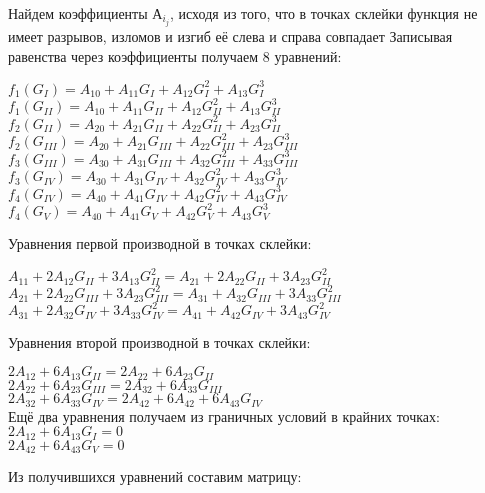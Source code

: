 \documentclass[russian,utf8,nocolumnxxxi,nocolumnxxxii]{eskdtext}
\begin{document}
Найдем коэффициенты $А_i_j$, исходя из того, что в точках склейки функция не имеет разрывов, изломов и изгиб её слева и справа совпадает Записывая равенства через коэффициенты получаем 8 уравнений:\\
\begin{center}
$f_{1}(G_{I})=A_{10}+A_{11}G_{I}+A_{12}G_{I}^2+A_{13}G_{I}^3$\\
$f_{1}(G_{II})=A_{10}+A_{11}G_{II}+A_{12}G_{II}^2+A_{13}G_{II}^3$\\
$f_{2}(G_{II})=A_{20}+A_{21}G_{II}+A_{22}G_{II}^2+A_{23}G_{II}^3$\\
$f_{2}(G_{III})=A_{20}+A_{21}G_{III}+A_{22}G_{III}^2+A_{23}G_{III}^3$\\
$f_{3}(G_{III})=A_{30}+A_{31}G_{III}+A_{32}G_{III}^2+A_{33}G_{III}^3$\\
$f_{3}(G_{IV})=A_{30}+A_{31}G_{IV}+A_{32}G_{IV}^2+A_{33}G_{IV}^3$\\
$f_{4}(G_{IV})=A_{40}+A_{41}G_{IV}+A_{42}G_{IV}^2+A_{43}G_{IV}^3$\\
$f_{4}(G_{V})=A_{40}+A_{41}G_{V}+A_{42}G_{V}^2+A_{43}G_{V}^3$\\
\end{center}
Уравнения первой производной в точках склейки:\\
\begin{center}
$A_{11}+2A_{12}G_{II}+3A_{13}G_{II}^2=A_{21}+2A_{22}G_{II}+3A_{23}G_{II}^2$\\
$A_{21}+2A_{22}G_{III}+3A_{23}G_{III}^2=A_{31}+A_{32}G_{III}+3A_{33}G_{III}^2$\\
$A_{31}+2A_{32}G_{IV}+3A_{33}G_{IV}^2=A_{41}+A_{42}G_{IV}+3A_{43}G_{IV}^2$\\
\end{center}
Уравнения второй производной в точках склейки:\\
\begin{center}
$2A_{12}+6A_{13}G_{II}=2A_{22}+6A_{23}G_{II}$\\
$2A_{22}+6A_{23}G_{III}=2A_{32}+6A_{33}G_{III}$\\
$2A_{32}+6A_{33}G_{IV}=2A_{42}+6A_{42}+6A_{43}G_{IV}$\\
Ещё два уравнения получаем из граничных условий в крайних точках:\\
$2A_{12}+6A_{13}G_{I}=0$\\
$2A_{42}+6A_{43}G_{V}=0$\\
\end{center}
Из получившихся уравнений составим матрицу:\\
\end{document}
